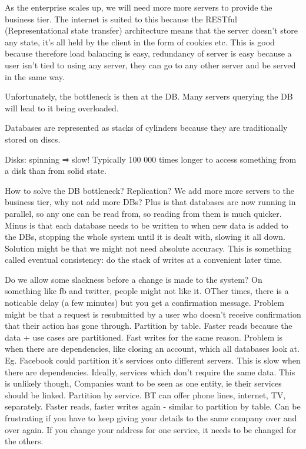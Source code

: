 \documentclass[11pt]{article}
\begin{document}
As the enterprise scales up, we will need more more servers to provide the business tier. The internet is suited to this because the RESTful (Representational state transfer) architecture means that the server doesn’t store any state, it’s all held by the client in the form of cookies etc. This is good because therefore load balancing is easy, redundancy of server is easy because a user isn’t tied to using any server, they can go to any other server and be served in the same way.

Unfortunately, the bottleneck is then at the DB. Many servers querying the DB will lead to it being overloaded.

Databases are represented as stacks of cylinders because they are traditionally stored on discs.

Disks: spinning ⇒ slow! Typically 100 000 times longer to access something from a disk than from solid state.

How to solve the DB bottleneck?
Replication? We add more more servers to the business tier, why not add more DBs? Plus is that databases are now running in parallel, so any one can be read from, so reading from them is much quicker. Minus is that each database needs to be written to when new data is added to the DBs, stopping the whole system until it is dealt with, slowing it all down. Solution might be that we might not need absolute accuracy. This is something called eventual consistency: do the stack of writes at a convenient later time.

Do we allow some slackness before a change is made to the system? On something like fb and twitter, people might not like it. OTher times, there is a noticable delay (a few minutes) but you get a confirmation message. Problem might be that a request is resubmitted by a user who doesn’t receive confirmation that their action has gone through.
Partition by table. Faster reads because the data + use cases are partitioned. Fast writes for the same reason. Problem is when there are dependencies, like closing an account, which all databases look at. Eg. Facebook could partition it’s services onto different servers. This is slow when there are dependencies. Ideally, services which don’t require the same data. This is unlikely though, Companies want to be seen as one entity, ie their services should be linked.
Partition by service. BT can offer phone lines, internet, TV, separately. Faster reads, faster writes again - similar to partition by table. Can be frustrating if you have to keep giving your details to the same company over and over again. If you change your address for one service, it needs to be changed for the others. 
\end{document}
